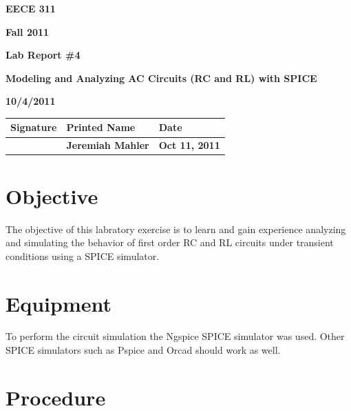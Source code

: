 \documentclass{article}
\begin{document}


\centerline{\bf EECE 311}
\centerline{\bf Fall 2011}
\centerline{\bf}
\centerline{\bf Lab Report \#4}
\centerline{\bf Modeling and Analyzing AC Circuits (RC and RL) with SPICE}
\centerline{\bf 10/4/2011}  %
\centerline{\bf}

\begin{center}
\begin{tabularx}{\textwidth}[b]{X l l}
Signature & Printed Name & Date \\
\hline
\multicolumn{1}{|X|}{} & \multicolumn{1}{|l|}{\bigstrut \bf Jeremiah Mahler} & \multicolumn{1}{|l|}{\bf Oct 11, 2011} \\
\hline
\end{tabularx}
\end{center}


\section{Objective}

The objective of this labratory exercise is to learn and gain
experience analyzing and simulating the behavior of first
order RC and RL circuits under transient conditions using a SPICE simulator.


\section{Equipment}

To perform the circuit simulation the Ngspice\cite{NGSPICE} SPICE\cite{wiki:SPICE} simulator was used.
Other SPICE simulators such as Pspice\cite{wiki:Pspice} and Orcad\cite{ORCAD}
should work as well.


\section{Procedure}
\end{document}
